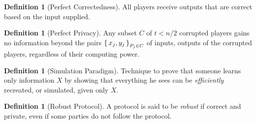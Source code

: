 \documentclass[10pt,a4paper,oneside]{memoir}
\theoremstyle{definition}
\newtheorem{dfn}[thm]{Definition}
\begin{document}
\begin{dfn}[Perfect Correctedness]
  All players receive outputs that are correct based on the input supplied.
\end{dfn}

\begin{dfn}[Perfect Privacy]
  Any subset $C$ of $t < n/2$ corrupted players gains no information beyond the
  pairs $\set{x_j, y_j}_{P_j \in C}$ of inputs, outputs of the corrupted
  players, regardless of their computing power.
\end{dfn}

\begin{dfn}[Simulation Paradigm]
  Technique to prove that someone learns only information $X$ by showing that
  everything he sees can be \emph{efficiently} recreated, or simulated, given
  only $X$.
\end{dfn}

\begin{dfn}[Robust Protocol]
  A protocol is said to be \emph{robust} if correct and private, even if some
  parties do not follow the protocol.
\end{dfn}
\end{document}
